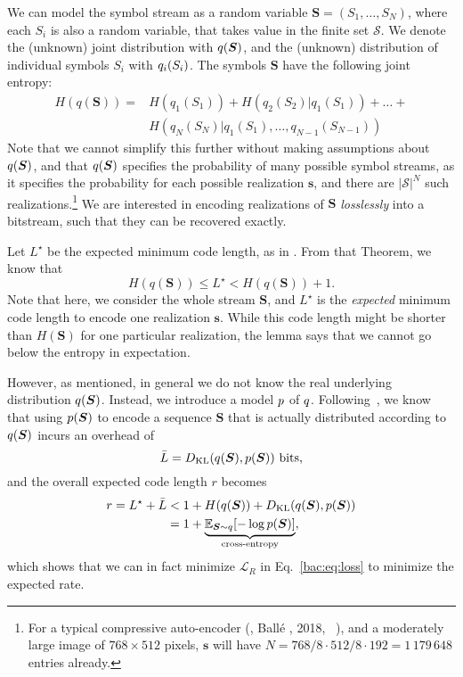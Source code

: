 We can model the symbol stream as a random variable
$\bm S = (S_1, \dots, S_N)$, where each $S_i$ is also a random variable,
that takes value in the finite set $\mathcal S$.
We denote the (unknown) joint distribution with $q(\bm S)$, and
the (unknown) distribution of individual symbols $S_i$ with $q_i(S_i)$.
The symbols $\bm S$ have the following joint entropy:
\begin{align}
    H(q(\bm S)) = 
        &H(q_1(S_1)) + H(q_2(S_2) | q_1(S_1)) + \dots +  \nonumber \\ 
        &H(q_N(S_N) | q_1(S_1), \dots, q_{N-1}(S_{N-1}))
\end{align}
Note that we cannot simplify this further without making assumptions
about $q(\bm S)$, and that $q(\bm S)$ specifies the probability of many
possible symbol streams, as it specifies the probability for each possible 
realization $\bm s$, and there are $|\mathcal{S}|^N$ such realizations.\footnote{For a typical compressive auto-encoder
(\eg, Ballé \etal, 2018, ~\cite{balle2018variational}), and a moderately large image of $768{\times}512$
pixels, $\bm s$ will have $N=768/8\cdot512/8\cdot192 = 1\,179\,648$ entries already.}
We are interested in encoding realizations of $\bm S$ \emph{losslessly} into a bitstream, such that they can be recovered exactly.

Let $L^\star$ be the expected minimum code length, as in 
\cite[Theorem 5.4.1, p113]{cover2012elements}. 
From that Theorem, we know that
\begin{equation}
    H(q(\bm S)) \leq L^\star < H(q(\bm S)) + 1. \label{bac:eq:bound}
\end{equation}
Note that here, we consider the whole stream $\bm S$, and $L^\star$ is the
\emph{expected} minimum code length to encode one realization $\bm s$.  While
this code length might be shorter than $H(\bm S)$ for one particular
realization, the lemma says that we cannot go below the entropy in expectation.

However, as mentioned, in general we do not know the real underlying
distribution $q(\bm S)$. Instead, we introduce a model $p$ of $q$.
Following~\cite[Theorem 5.4.3,
p115]{cover2012elements},
we know that using $p(\bm S)$ to encode a sequence $\bm S$ that is
actually distributed according to $q(\bm S)$ incurs an overhead of
\begin{equation}
    \bar L = D_\text{KL}(q(\bm S) , p(\bm S)) \text{ bits,} \label{bac:eq:overhead}
\end{equation}
and the overall expected code length $r$ becomes
\begin{align}
    r = L^\star + \bar L 
            &< 1 + H(q(\bm S)) + D_\text{KL}(q(\bm S ), p(\bm S)) \nonumber \\
            &= 1 + \underbrace{\mathbb{E}_{\bm S \sim q}[-\log p(\bm S)]}_\textrm{cross-entropy}, \label{bac:eq:final_r}
\end{align}
which shows that we can in fact minimize $\mathcal L_R$ in Eq.~\ref{bac:eq:loss} to minimize the expected rate.

